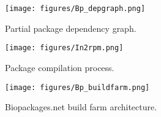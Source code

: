 \pagebreak

\begin{figure}[p]
\texttt{[image: figures/Bp\_depgraph.png]}
\caption{Partial package dependency graph.}
\label{fig:bp_depgraph}
\end{figure}

\begin{figure}[p]
\texttt{[image: figures/In2rpm.png]}
\caption{Package compilation process.}
\label{fig:In2rpm}
\end{figure}

\begin{figure}[p]
\texttt{[image: figures/Bp\_buildfarm.png]}
\caption{Biopackages.net build farm architecture.}
\label{fig:bp_buildfarm}
\end{figure}


\pagebreak




